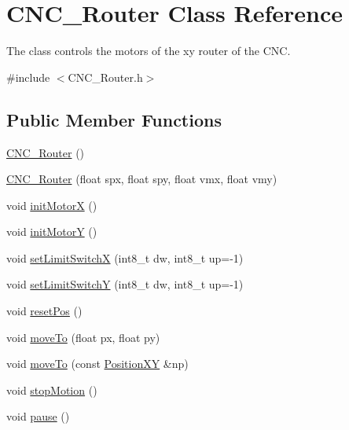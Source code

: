 \hypertarget{class_c_n_c___router}{\section{C\+N\+C\+\_\+\+Router Class Reference}
\label{class_c_n_c___router}
}


The class controls the motors of the xy router of the C\+N\+C.  




{\ttfamily \#include $<$C\+N\+C\+\_\+\+Router.\+h$>$}

\subsection*{Public Member Functions}
\begin{DoxyCompactItemize}
\item 
\hyperlink{class_c_n_c___router_a2286f545f42ff5febfdb8d52782cd0da}{C\+N\+C\+\_\+\+Router} ()
\item 
\hyperlink{class_c_n_c___router_a928dbfed47e8514928b92559372378f0}{C\+N\+C\+\_\+\+Router} (float spx, float spy, float vmx, float vmy)
\item 
void \hyperlink{class_c_n_c___router_a89f4cbde58844154f247d2bf02a167fb}{init\+Motor\+X} ()
\item 
void \hyperlink{class_c_n_c___router_a7f13e636e4b92c5547995b653cea317e}{init\+Motor\+Y} ()
\item 
void \hyperlink{class_c_n_c___router_a0d1313b481b864a85758aaeab61e6595}{set\+Limit\+Switch\+X} (int8\+\_\+t dw, int8\+\_\+t up=-\/1)
\item 
void \hyperlink{class_c_n_c___router_af9308de7c3273a4f7dc18bc3cfe617d4}{set\+Limit\+Switch\+Y} (int8\+\_\+t dw, int8\+\_\+t up=-\/1)
\item 
void \hyperlink{class_c_n_c___router_a30d838430b7452a8f47071d2f6b8845e}{reset\+Pos} ()
\item 
void \hyperlink{class_c_n_c___router_aa8f1afb0edd66b1597bb8fd3a0689ed9}{move\+To} (float px, float py)
\item 
void \hyperlink{class_c_n_c___router_a22accd2ec43457dfb0d990cc6eec45d3}{move\+To} (const \hyperlink{class_position_x_y}{Position\+X\+Y} \&np)
\item 
void \hyperlink{class_c_n_c___router_aebacab02935c41a4c11b926c0770bcac}{stop\+Motion} ()
\item 
void \hyperlink{class_c_n_c___router_a6b5ad1a227e63d3f374e0e53f3cf047c}{pause} ()
\item 

\end{DoxyCompactItemize}
